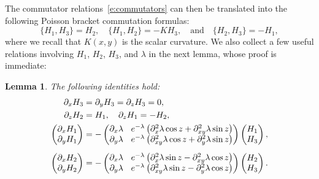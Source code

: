 \documentclass[10pt]{amsart}
\theoremstyle{plain}
\newtheorem{lemm}[theo]{Lemma}
\theoremstyle{definition}
\theoremstyle{remark}
\begin{document}
The commutator relations~\eqref{e:commutators} can then be translated into the following Poisson bracket commutation formulas:
\begin{equation}\label{e:commutators-hamiltonian}
\{H_1,H_3\}=H_2,\quad \{H_1,H_2\}=-KH_3,\quad\text{and}\quad\{H_2,H_3\}=-H_1,
\end{equation}
where we recall that $K(x,y)$ is the scalar curvature. We also collect a few useful relations involving $H_1$, $H_2$, $H_3$, and $\lambda$ in the next lemma, whose proof is immediate:

\begin{lemm} The following identities hold:
\begin{align}
\label{e:trivial-relation-H3}\partial_xH_3 & =\partial_yH_3=\partial_zH_3=0, \\
\label{e:intertwine-H1H2}\partial_zH_2 & =H_1,\quad \partial_zH_1=-H_2, \\
\label{e:derivative-H1}
\begin{pmatrix} \partial_xH_1\\ \partial_yH_1\end{pmatrix} &\arraycolsep4.5pt =-\begin{pmatrix} \partial_x\lambda &e^{-\lambda}\left(\partial_x^2\lambda \cos z+\partial^2_{xy}\lambda\sin z\right) \\ \partial_y\lambda &e^{-\lambda}\left(\partial_{xy}^2\lambda \cos z+\partial^2_{y}\lambda\sin z\right) \end{pmatrix}\begin{pmatrix} H_1\\H_3\end{pmatrix}, \\[5pt]
\label{e:derivative-H2}
\begin{pmatrix} \partial_xH_2\\ \partial_yH_2\end{pmatrix} &\arraycolsep4.5pt =-\begin{pmatrix} \partial_x\lambda &e^{-\lambda}\left(\partial_x^2\lambda \sin z-\partial^2_{xy}\lambda\cos z\right) \\ \partial_y\lambda &e^{ -\lambda}\left(\partial_{xy}^2\lambda \sin z-\partial^2_{y}\lambda\cos z\right) \end{pmatrix}\begin{pmatrix} H_2\\H_3\end{pmatrix}.
\end{align}
\end{lemm}
\end{document}
